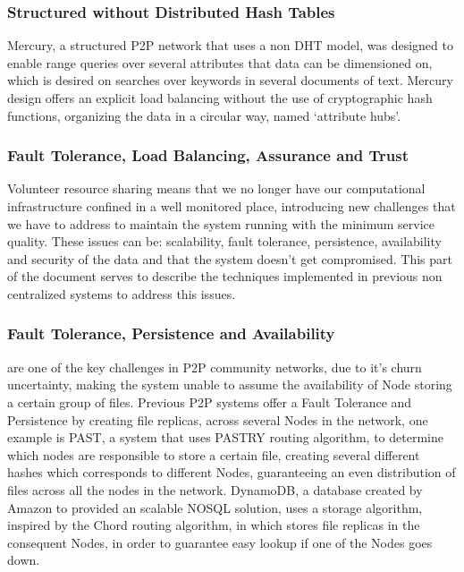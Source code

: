 \subsubsection{Structured without Distributed Hash Tables}\label{par:Structured without Non-Distributed Hash Tables}

Mercury\cite{Bharambe}, a structured P2P network that uses a non DHT model, was designed to enable range queries over several attributes that data can be dimensioned on, which is desired on searches over keywords in several documents of text. Mercury design offers an explicit load balancing without the use of cryptographic hash functions, organizing the data in a circular way, named `attribute hubs'.

\subsubsection{Fault Tolerance, Load Balancing, Assurance and Trust}

Volunteer resource sharing means that we no longer have our computational infrastructure confined in a well monitored place, introducing new challenges that we have to address \cite{Koloniari2005} to maintain the system running with the minimum service quality. These issues can be: scalability, fault tolerance, persistence, availability and security\cite{Wallach} of the data and that the system doesn't get compromised. This part of the document serves to describe the techniques implemented in previous non centralized systems to address this issues.

\subsubsection{Fault Tolerance, Persistence and Availability}\label{par:Fault Tolerance, Persistence and Availability}

are one of the key challenges in P2P community networks, due to it's churn uncertainty, making the system unable to assume the availability of Node storing a certain group of files. Previous P2P systems offer a Fault Tolerance and Persistence by creating file replicas, across several Nodes in the network, one example is PAST\cite{Rowstron2001}\cite{Rowstron2001a}, a system that uses PASTRY routing algorithm, to determine which nodes are responsible to store a certain file, creating several different hashes which corresponds to different Nodes, guaranteeing an even distribution of files across all the nodes in the network. DynamoDB\cite{Decandia2007}, a database created by Amazon to provided an scalable NOSQL solution, uses a storage algorithm, inspired by the Chord routing algorithm, in which stores file replicas in the consequent Nodes, in order to guarantee easy lookup if one of the Nodes goes down.

